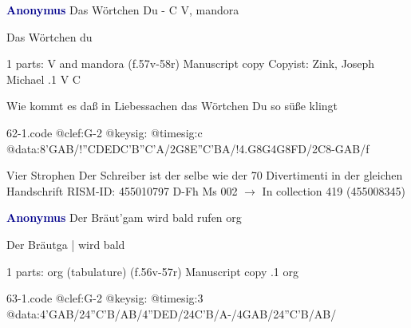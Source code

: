 \documentclass[twocolumn]{book}
\begin{document}
\newline \par \vspace{7pt} \textcolor{darkblue}{\textbf{Anonymus  }}
\newline Das Wörtchen Du - C
\newline V, mandora
\newline \begin{itshape}[heading, f.57v:] Das Wörtchen du\end{itshape} 
\newline \textcolor{darkblue}{}  1 parts: V and mandora  (f.57v-58r)
\newline Manuscript copy
\newline Copyist: Zink, Joseph Michael
.1  V  C
\newline \begin{footnotesize} Wie kommt es daß in Liebessachen das Wörtchen Du so süße klingt \end{footnotesize}  
\begin{filecontents*}{62-1.code}
@clef:G-2
@keysig:
@timesig:c
@data:8'GAB/!{''CD}{ED}{C'B}{''C'A}/2G8E''C'BA/!4.G8G4G8FD/2C8-GAB/f
\end{filecontents*}
\newline
%

\newline Vier Strophen
\newline Der Schreiber ist der selbe wie der 70 Divertimenti in der gleichen Handschrift
\newline RISM-ID: 455010797
\newline D-Fh  Ms 002
\newline $\rightarrow$ In collection 419 (455008345)
      
\newline \par \vspace{7pt} \textcolor{darkblue}{\textbf{Anonymus  }}
\newline Der Bräut'gam wird bald rufen
\newline org
\newline \begin{itshape}[f.56v, at left:] Der Bräutga | wird bald\end{itshape} 
\newline \textcolor{darkblue}{}  1 parts: org (tabulature)  (f.56v-57r)
\newline Manuscript copy
.1  org  
\begin{filecontents*}{63-1.code}
@clef:G-2
@keysig:
@timesig:3
@data:4'GAB/24''C'B/AB/4''DED/24C'B/A-/4GAB/24''C'B/AB/
\end{filecontents*}
\newline
%
\end{document}
